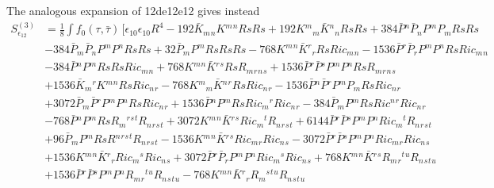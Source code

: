 The analogous expansion of 12de12e12 gives instead
\begin{align} \label{eq:epepR4-expand}
S^{(3)}_{\epsilon_{12}} &= \frac{1}{8} \int f_0(\tau,\bar{\tau})\,  \bigg [  \epsilon_{10} \epsilon_{10}  R^4
  - 192 \bar{K}{}_{m}{}_{n} K{}^{m}{}^{n} Rs Rs
  + 192 K{}^{m}{}_{m} \bar{K}{}^{n}{}_{n} Rs Rs
  + 384 \bar{P}{}^{n} \bar{P}{}_{n} P{}^{m} P{}_{m} Rs Rs
\nonumber \\&
  - 384 \bar{P}{}_{m} \bar{P}{}_{n} P{}^{m} P{}^{n} Rs Rs
  + 32 \bar{P}{}_{m} P{}^{m} Rs Rs Rs
  - 768 K{}^{m}{}^{n} \bar{K}{}^{r}{}_{r} Rs Ric{}_{m}{}_{n}
  - 1536 \bar{P}{}^{r} \bar{P}{}_{r} P{}^{m} P{}^{n} Rs Ric{}_{m}{}_{n}
\nonumber \\&
  - 384 \bar{P}{}^{n} P{}^{m} Rs Rs Ric{}_{m}{}_{n}
  + 768 K{}^{m}{}^{n} \bar{K}{}^{r}{}^{s} Rs R{}_{m}{}_{r}{}_{n}{}_{s}
  + 1536 \bar{P}{}^{r} \bar{P}{}^{s} P{}^{m} P{}^{n} Rs R{}_{m}{}_{r}{}_{n}{}_{s}
\nonumber \\&
  + 1536 \bar{K}{}_{m}{}^{r} K{}^{m}{}^{n} Rs Ric{}_{n}{}_{r}
  - 768 K{}^{m}{}_{m} \bar{K}{}^{n}{}^{r} Rs Ric{}_{n}{}_{r}
  - 1536 \bar{P}{}^{n} \bar{P}{}^{r} P{}^{m} P{}_{m} Rs Ric{}_{n}{}_{r}
\nonumber \\&
  + 3072 \bar{P}{}_{m} \bar{P}{}^{r} P{}^{m} P{}^{n} Rs Ric{}_{n}{}_{r}
  + 1536 \bar{P}{}^{n} P{}^{m} Rs Ric{}_{m}{}^{r} Ric{}_{n}{}_{r}
  - 384 \bar{P}{}_{m} P{}^{m} Rs Ric{}^{n}{}^{r} Ric{}_{n}{}_{r}
\nonumber \\&
  - 768 \bar{P}{}^{n} P{}^{m} Rs R{}_{m}{}^{r}{}^{s}{}^{t} R{}_{n}{}_{r}{}_{s}{}_{t}
  + 3072 K{}^{m}{}^{n} \bar{K}{}^{r}{}^{s} Ric{}_{m}{}^{t} R{}_{n}{}_{r}{}_{s}{}_{t}
  + 6144 \bar{P}{}^{r} \bar{P}{}^{s} P{}^{m} P{}^{n} Ric{}_{m}{}^{t} R{}_{n}{}_{r}{}_{s}{}_{t}
\nonumber \\&
  + 96 \bar{P}{}_{m} P{}^{m} Rs R{}^{n}{}^{r}{}^{s}{}^{t} R{}_{n}{}_{r}{}_{s}{}_{t}
  - 1536 K{}^{m}{}^{n} \bar{K}{}^{r}{}^{s} Ric{}_{m}{}_{r} Ric{}_{n}{}_{s}
  - 3072 \bar{P}{}^{r} \bar{P}{}^{s} P{}^{m} P{}^{n} Ric{}_{m}{}_{r} Ric{}_{n}{}_{s}
\nonumber \\&
  + 1536 K{}^{m}{}^{n} \bar{K}{}^{r}{}_{r} Ric{}_{m}{}^{s} Ric{}_{n}{}_{s}
  + 3072 \bar{P}{}^{r} \bar{P}{}_{r} P{}^{m} P{}^{n} Ric{}_{m}{}^{s} Ric{}_{n}{}_{s}
  + 768 K{}^{m}{}^{n} \bar{K}{}^{r}{}^{s} R{}_{m}{}_{r}{}^{t}{}^{u} R{}_{n}{}_{s}{}_{t}{}_{u}
\nonumber \\&
  + 1536 \bar{P}{}^{r} \bar{P}{}^{s} P{}^{m} P{}^{n} R{}_{m}{}_{r}{}^{t}{}^{u} R{}_{n}{}_{s}{}_{t}{}_{u}
  - 768 K{}^{m}{}^{n} \bar{K}{}^{r}{}_{r} R{}_{m}{}^{s}{}^{t}{}^{u} R{}_{n}{}_{s}{}_{t}{}_{u}

\end{align}
